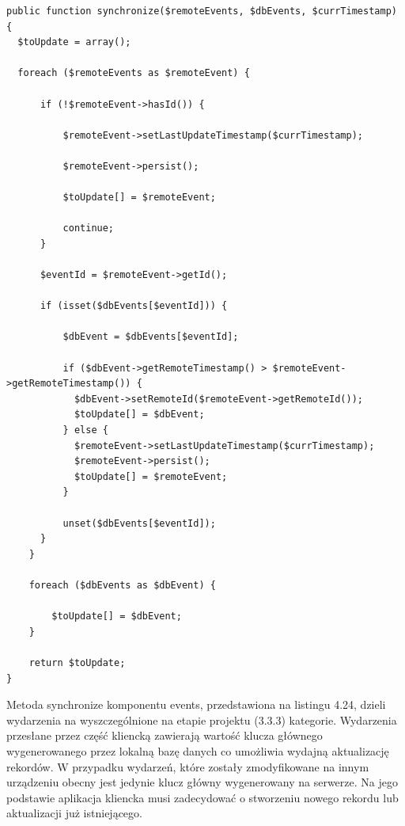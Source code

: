 \begin{lstlisting}[style=php, caption=Modyfikacja wydarzeń w metodzie synchronize komponentu Events., label=amb, captionpos=b]
public function synchronize($remoteEvents, $dbEvents, $currTimestamp) {
  $toUpdate = array();

  foreach ($remoteEvents as $remoteEvent) {

      if (!$remoteEvent->hasId()) {

	      $remoteEvent->setLastUpdateTimestamp($currTimestamp);

          $remoteEvent->persist();

          $toUpdate[] = $remoteEvent;

          continue;
      }

      $eventId = $remoteEvent->getId();

      if (isset($dbEvents[$eventId])) {

          $dbEvent = $dbEvents[$eventId];

          if ($dbEvent->getRemoteTimestamp() > $remoteEvent->getRemoteTimestamp()) {
          	$dbEvent->setRemoteId($remoteEvent->getRemoteId());
            $toUpdate[] = $dbEvent;
          } else {
            $remoteEvent->setLastUpdateTimestamp($currTimestamp);
            $remoteEvent->persist();
            $toUpdate[] = $remoteEvent;
          }

          unset($dbEvents[$eventId]);
      }
    }

    foreach ($dbEvents as $dbEvent) {

       	$toUpdate[] = $dbEvent;
    }

   	return $toUpdate;
}
\end{lstlisting}

Metoda synchronize komponentu events, przedstawiona na listingu 4.24, dzieli wydarzenia na wyszczególnione na etapie projektu (3.3.3) kategorie. Wydarzenia przesłane przez część kliencką zawierają wartość klucza głównego wygenerowanego przez lokalną bazę danych co umożliwia wydajną aktualizację rekordów. W przypadku wydarzeń, które zostały zmodyfikowane na innym urządzeniu obecny jest jedynie klucz główny wygenerowany na serwerze. Na jego podstawie aplikacja kliencka musi zadecydować o stworzeniu nowego rekordu lub aktualizacji już istniejącego.
